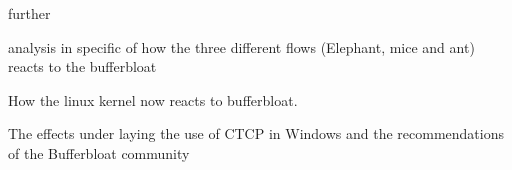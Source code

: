 further


analysis in specific of how the three different flows (Elephant, mice and ant) reacts to the bufferbloat

How the linux kernel now reacts to bufferbloat.

The effects under laying the use of CTCP\cite{Tan06compoundtcp}\cite{4146841} in Windows and the recommendations of the Bufferbloat community\cite{windowstips} 